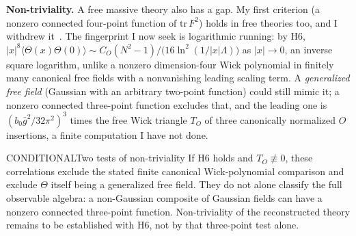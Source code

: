 \textbf{Non-triviality.} A free massive theory also has a gap. My first criterion (a nonzero connected four-point function of
$\mathrm{tr}\,F^2$) holds in free theories too, and I withdrew it~\cite{ClosedSet}. The fingerprint I now seek is logarithmic
running: by H6, $|x|^8\langle\Theta(x)\Theta(0)\rangle\sim C_O(N^2-1)/\bigl(16\ln^2(1/|x|\Lambda)\bigr)$ as
$|x|\to0$, an inverse square logarithm, unlike a nonzero dimension-four Wick polynomial in finitely many canonical
free fields with a nonvanishing leading scaling term. A \emph{generalized free field} (Gaussian with an arbitrary two-point function) could still mimic it; a
nonzero connected three-point function excludes that, and the leading one is $(b_0\bar g^2/32\pi^2)^3$ times the free
Wick triangle $T_O$ of three canonically normalized $O$ insertions, a finite computation I have not done.

\begin{claim}{CONDITIONAL}{Two tests of non-triviality}\label{b:nontrivial}
If H6 holds and $T_O\not\equiv0$, these correlations exclude the stated finite canonical Wick-polynomial comparison
and exclude $\Theta$ itself being a generalized free field. They do not alone classify the full observable algebra:
a non-Gaussian composite of Gaussian fields can have a nonzero connected three-point function.
Non-triviality of the reconstructed theory remains to be established with H6, not by that three-point test alone.
\end{claim}
